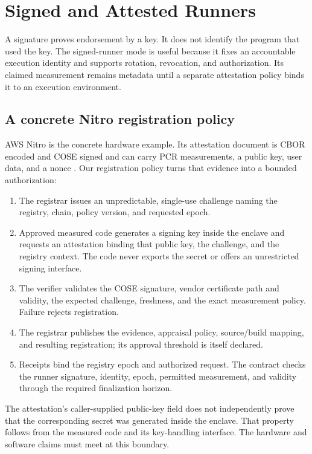 \section{Signed and Attested Runners}
\label{sec:tee}

A signature proves endorsement by a key. It does not identify the program that used the key. The signed-runner mode is useful because it fixes an accountable execution identity and supports rotation, revocation, and authorization. Its claimed measurement remains metadata until a separate attestation policy binds it to an execution environment.

\subsection{A concrete Nitro registration policy}

AWS Nitro is the concrete hardware example. Its attestation document is CBOR encoded and COSE signed and can carry PCR measurements, a public key, user data, and a nonce \cite{nitrodocs}. Our registration policy turns that evidence into a bounded authorization:
\begin{enumerate}
\item The registrar issues an unpredictable, single-use challenge naming the registry, chain, policy version, and requested epoch.
\item Approved measured code generates a signing key inside the enclave and requests an attestation binding that public key, the challenge, and the registry context. The code never exports the secret or offers an unrestricted signing interface.
\item The verifier validates the COSE signature, vendor certificate path and validity, the expected challenge, freshness, and the exact measurement policy. Failure rejects registration.
\item The registrar publishes the evidence, appraisal policy, source/build mapping, and resulting registration; its approval threshold is itself declared.
\item Receipts bind the registry epoch and authorized request. The contract checks the runner signature, identity, epoch, permitted measurement, and validity through the required finalization horizon.
\end{enumerate}

The attestation's caller-supplied public-key field does not independently prove that the corresponding secret was generated inside the enclave. That property follows from the measured code and its key-handling interface. The hardware and software claims must meet at this boundary.

